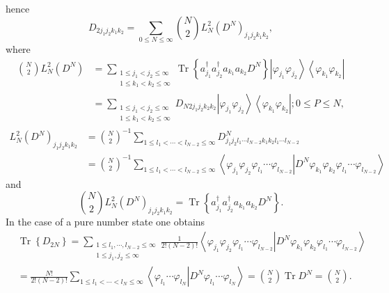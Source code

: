 \documentclass[aps,preprint]{revtex4}%
\begin{document}
hence%
\begin{equation}
D_{2j_{1}j_{2}k_{1}k_{2}}=\sum_{0\leq N\leq\infty}\binom{N}{2}L_{N}^{2}\left(
D^{N}\right)  _{j_{1}j_{2}k_{1}k_{2}},
\end{equation}
where%
\begin{align}
\binom{N}{2}L_{N}^{2}\left(  D^{N}\right)   &  =\sum_{\substack{1\leq
j_{1}<j_{2}\leq\infty\\1\leq k_{1}<k_{2}\leq\infty}}\operatorname{Tr}\left\{
a_{j_{1}}^{\dagger}a_{j_{2}}^{\dagger}a_{k_{1}}a_{k_{2}}D^{N}\right\}
\left\vert \varphi_{j_{1}}\varphi_{j_{2}}\right\rangle \left\langle
\varphi_{k_{1}}\varphi_{k_{2}}\right\vert \nonumber\\
&  =\sum_{\substack{1\leq j_{1}<j_{2}\leq\infty\\1\leq k_{1}<k_{2}\leq\infty
}}D_{N2j_{1}j_{2}k_{2}k_{2}}\left\vert \varphi_{j_{1}}\varphi_{j_{2}%
}\right\rangle \left\langle \varphi_{k_{1}}\varphi_{k_{2}}\right\vert ;0\leq
P\leq N,
\end{align}%
\begin{align}
L_{N}^{2}\left(  D^{N}\right)  _{j_{1}j_{2}k_{1}k_{2}} &  =\binom{N}{2}%
^{-1}\sum_{1\leq l_{1}<\cdots<l_{N-2}\leq\infty}D_{j_{1}j_{2}l_{1}\cdots
l_{N-2}k_{1}k_{2}l_{1}\cdots l_{N-2}}^{N}\nonumber\\
&  =\binom{N}{2}^{-1}\sum_{1\leq l_{1}<\cdots<l_{N-2}\leq\infty}\left\langle
\left.  \varphi_{j_{1}}\varphi_{j_{2}}\varphi_{l_{1}}\cdots\varphi_{l_{N-2}%
}\right\vert D^{N}\varphi_{k_{1}}\varphi_{k_{2}}\varphi_{l_{1}}\cdots
\varphi_{l_{N-2}}\right\rangle
\end{align}
and
\begin{equation}
\binom{N}{2}L_{N}^{2}\left(  D^{N}\right)  _{j_{1}j_{2}k_{1}k_{2}%
}=\operatorname{Tr}\left\{  a_{j_{1}}^{\dagger}a_{j_{2}}^{\dagger}a_{k_{1}%
}a_{k_{2}}D^{N}\right\}  .
\end{equation}
In the case of a pure number state one obtains%
\begin{align}
&  \operatorname{Tr}\left\{  D_{2N}\right\}  =\sum_{\substack{1\leq
l_{1},\cdots,l_{N-2}\leq\infty\\1\leq j_{1},j_{2}\leq\infty}}\frac
{1}{2!\left(  N-2\right)  !}\left\langle \left.  \varphi_{j_{1}}\varphi
_{j_{2}}\varphi_{l_{1}}\cdots\varphi_{l_{N-2}}\right\vert D^{N}\varphi_{k_{1}%
}\varphi_{k_{2}}\varphi_{l_{1}}\cdots\varphi_{l_{N-2}}\right\rangle
\nonumber\\
&  =\frac{N!}{2!\left(  N-2\right)  !}\sum_{1\leq l_{1}<\cdots<l_{N}\leq
\infty}\left\langle \left.  \varphi_{l_{1}}\cdots\varphi_{l_{N}}\right\vert
D^{N}\varphi_{l_{1}}\cdots\varphi_{l_{N}}\right\rangle =\binom{N}%
{2}\operatorname{Tr}D^{N}=\binom{N}{2}.
\end{align}
\end{document}
